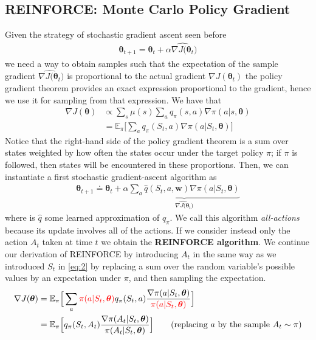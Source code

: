 {\subsection{REINFORCE: Monte Carlo Policy Gradient}
Given the strategy of stochastic gradient ascent seen before
\begin{align}\label{eq:3}
\bm{\theta}_{t+1} = \bm{\theta}_t + \alpha \widehat{\nabla J(\bm{\theta}_t})
\end{align}
we need a way to obtain samples such that the expectation of the sample gradient $\widehat{\nabla J(\bm{\theta}_t})$ is proportional to the actual gradient $\nabla J(\bm{\theta}_t)$ the policy gradient theorem provides an exact expression proportional to the gradient, hence we use it for sampling from that expression.
We have that 
\begin{align}\label{eq:2}
    \nabla J(\bm{\theta})&\propto\sum_{s}\mu(s)\sum_a q_\pi(s,a)\nabla\pi(a|s, \bm{\theta})\\
    &=\mathbb{E}_\pi\Big[\sum_a q_\pi(S_t,a)\nabla\pi(a|S_t, \bm{\theta})\Big]
\end{align}
Notice that the right-hand side of the policy gradient theorem is a sum over states weighted by how often the states occur under the target policy $\pi$; if $\pi$ is followed, then states will be encountered in these proportions.
Then, we can instantiate a first stochastic gradient-ascent algorithm as
\begin{align}
    \bm{\theta}_{t+1}\doteq\bm{\theta}_t+\alpha\underbrace{\sum_a \hat{q}(S_t,a, \bm{w})\nabla\pi(a|S_t, \bm{\theta})}_{\widehat{\nabla J(\bm{\theta}_t})}
\end{align}
where is $\hat{q}$ some learned approximation of $q_\pi$.
We call this algorithm \textit{all-actions} because its update involves all of the actions.
If we consider instead only the action $A_t$ taken at time $t$ we obtain the \textbf{REINFORCE algorithm}.
We continue our derivation of REINFORCE by introducing $A_t$ in the same way as we introduced $S_t$ in \ref{eq:2} by replacing a sum over the random variable’s possible values by an expectation under $\pi$, and then sampling the expectation.
\begin{align*}
    \nabla J(\bm{\theta})&=\mathbb{E}_\pi\Big[\sum_a \textcolor{red}{\pi(a|S_t, \bm{\theta})}q_\pi(S_t,a)\frac{\nabla\pi(a|S_t, \bm{\theta})}{\textcolor{red}{\pi(a|S_t, \bm{\theta})}}\Big]\\
    &=\mathbb{E}_\pi\Big[q_\pi(S_t, A_t)\frac{\nabla\pi(A_t|S_t, \bm{\theta})}{\pi(A_t|S_t, \bm{\theta})}\Big] \qquad\text{(replacing $a$ by the sample $A_t\sim\pi$)}\\

\end{align*}}
